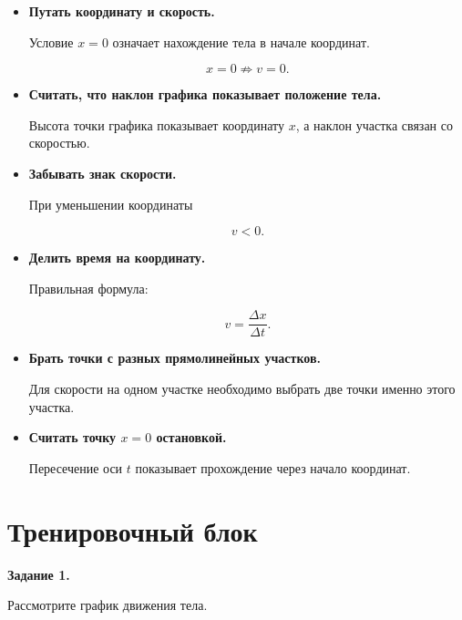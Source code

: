 \documentclass[a4paper,12pt]{article}
\newcommand{\key}[1]{\textbf{\color{darkaccent}#1}}
\begin{document}
\begin{itemize}
  \item \key{Путать координату и скорость.}

  Условие \(x=0\) означает нахождение тела в начале координат.

  \[
  x=0 \not\Rightarrow v=0.
  \]

  \item \key{Считать, что наклон графика показывает положение тела.}

  Высота точки графика показывает координату \(x\), а наклон участка связан со скоростью.

  \item \key{Забывать знак скорости.}

  При уменьшении координаты

  \[
  v<0.
  \]

  \item \key{Делить время на координату.}

  Правильная формула:

  \[
  v=\frac{\Delta x}{\Delta t}.
  \]

  \item \key{Брать точки с разных прямолинейных участков.}

  Для скорости на одном участке необходимо выбрать две точки именно этого участка.

  \item \key{Считать точку \(x=0\) остановкой.}

  Пересечение оси \(t\) показывает прохождение через начало координат.
\end{itemize}

\section{Тренировочный блок}

\textbf{Задание 1.}

Рассмотрите график движения тела.

\begin{center}
\end{center}
\end{document}
